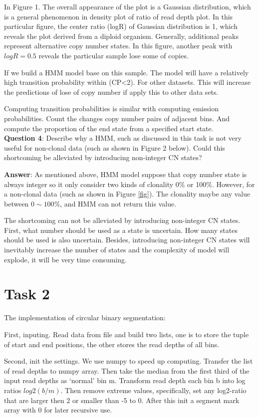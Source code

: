 \documentclass[a4paper]{article}
\begin{document}
In Figure 1. The overall appearance of the plot is a Gaussian distribution, which is a general phenomenon in density plot of ratio of read depth plot. In this particular figure, the center ratio (logR) of Gaussian distribution is 1, which reveals the plot derived from a diploid organism. Generally, additional peaks represent alternative copy number states. In this figure, another peak with $logR=0.5$ reveals the particular sample lose some of copies. 

If we build a HMM model base on this sample. The model will have a relatively high transition probability within (CP<2). For other datasets. This will increase the predictions of lose of copy number if apply this to other data sets. 

Computing transition probabilities is similar with computing emission probabilities. Count the changes copy number pairs of adjacent bins. And compute the proportion of the end state from a specified start state.\\

\noindent\textbf{Question 4}: Describe why a HMM, such as discussed in this task is not very useful for non-clonal data (such as shown in Figure 2 below). Could this shortcoming be alleviated by introducing non-integer CN states?

\noindent\textbf{Answer}: As mentioned above, HMM model suppose that copy number state is always integer so it only consider two kinds of clonality 0\% or 100\%. However, for a non-clonal data (such as shown in Figure \ref{fig}). The clonality maybe any value between $0\sim100\%$, and HMM can not return this value.

The shortcoming can not be alleviated by introducing non-integer CN states. First, what number should be used as a state is uncertain. How many states should be used is also uncertain. Besides, introducing non-integer CN states will inevitably increase the number of states and the complexity of model will explode, it will be very time consuming.

\section{Task 2}

The implementation of circular binary segmentation:

First, inputing. Read data from file and build two lists, one is to store the tuple of start and end positions, the other stores the read depths of all bins. 

Second, init the settings. We use numpy to speed up computing. Transfer the list of read depths to numpy array. Then take the median from the first third of the input read depths as `normal' bin m. Transform read depth each bin b into log ratios $log2(b/m)$. Then remove extreme values, specifically, set any log2-ratio that are larger then 2 or smaller than -5 to 0. After this init a segment mark array with 0 for later recursive use. 
\end{document}
